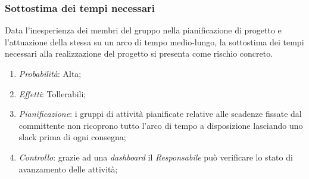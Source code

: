 \subsubsection{Sottostima dei tempi necessari}
Data l'inesperienza dei membri del gruppo nella pianificazione di progetto e l'attuazione della stessa su un arco di tempo medio-lungo, la sottostima dei tempi necessari alla realizzazione del progetto si presenta come rischio concreto.
\begin{enumerate}
\item \textit{Probabilit\`a}: Alta;
\item \textit{Effetti}: Tollerabili;
\item \textit{Pianificazione}: i gruppi di attivit\`a pianificate relative alle scadenze fissate dal committente non ricoprono tutto l'arco di tempo a disposizione lasciando uno slack prima di ogni consegna;
\item \textit{Controllo}: grazie ad una \textit{dashboard} il \textit{Responsabile} pu\`o verificare lo stato di avanzamento delle attivit\`a;
\end{enumerate}

